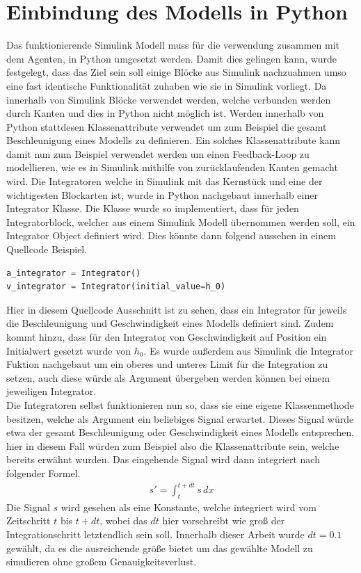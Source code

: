 \documentclass[]{iat}
\begin{document}
\section{Einbindung des Modells in Python} \label{sec:simulink_to_py}
Das funktionierende Simulink Modell muss für die verwendung zusammen mit dem Agenten, in Python umgesetzt werden. Damit dies gelingen kann, wurde festgelegt, dass das Ziel sein soll einige Blöcke aus Simulink nachzuahmen umso eine fast identische Funktionalität zuhaben wie sie in Simulink vorliegt. Da innerhalb von Simulink Blöcke verwendet werden, welche verbunden werden durch Kanten und dies in Python nicht möglich ist. Werden innerhalb von Python stattdesen Klassenattribute verwendet um zum Beispiel die gesamt Beschleunigung eines Modells zu definieren. Ein solches Klassenattribute kann damit nun zum Beispiel verwendet werden um einen Feedback-Loop zu modellieren, wie es in Simulink mithilfe von zurücklaufenden Kanten gemacht wird. Die Integratoren welche in Simulink mit das Kernstück und eine der wichtigesten Blockarten ist, wurde in Python nachgebaut innerhalb einer Integrator Klasse. Die Klasse wurde so implementiert, dass für jeden Integratorblock, welcher aus einem Simulink Modell übernommen werden soll, ein Integrator Object definiert wird. Dies könnte dann folgend aussehen in einem Quellcode Beispiel.
\begin{lstlisting}[language=Python]
a_integrator = Integrator()
v_integrator = Integrator(initial_value=h_0)
\end{lstlisting}
Hier in diesem Quellcode Ausschnitt ist zu sehen, dass ein Integrator für jeweils die Beschleunigung und Geschwindigkeit eines Modells definiert sind. Zudem kommt hinzu, dass für den Integrator von Geschwindigkeit auf Position ein Initialwert gesetzt wurde von $h_0$. Es wurde außerdem aus Simulink die Integrator Fuktion nachgebaut um ein oberes und unteres Limit für die Integration zu setzen, auch diese würde als Argument übergeben werden können bei einem jeweiligen Integrator.\\
Die Integratoren selbst funktionieren nun so, dass sie eine eigene Klassenmethode besitzen, welche als Argument ein beliebiges Signal erwartet. Dieses Signal würde etwa der gesamt Beschleunigung oder Geschwindigkeit eines Modells entsprechen, hier in diesem Fall würden zum Beispiel also die Klassenattribute sein, welche bereits erwähnt wurden. Das eingehende Signal wird dann integriert nach folgender Formel.
\begin{align*}
    s' = \int_{t}^{t+dt} s \, dx
\end{align*}
Die Signal $s$ wird gesehen als eine Konstante, welche integriert wird vom Zeitschritt $t$ bis $t + dt$, wobei das $dt$ hier vorschreibt wie groß der Integrationschritt letztendlich sein soll. Innerhalb dieser Arbeit wurde $dt = 0.1$ gewählt, da es die ausreichende größe bietet um das gewählte Modell zu simulieren ohne großem Genauigkeitsverlust.
\newpage
\end{document}
